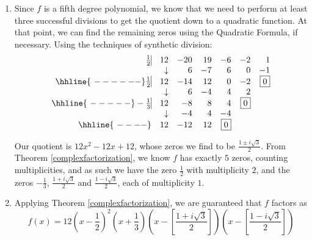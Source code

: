 \documentclass{ximera}
\begin{document}
\begin{exampleSol}
\begin{enumerate}
\item  Since $f$ is a fifth degree polynomial, we know that we need to perform at least three successful divisions to get the quotient down to a quadratic function.  At that point, we can find the remaining zeros using the Quadratic Formula, if necessary.  Using the techniques of synthetic division: %
\[
\begin{array}{rrrrrrr}
    \frac{1}{2}   \vline& 12 & -20& 19  & -6 & -2 &1 \\
    & \downarrow     &  6  &  -7  & 6 & 0 & -1\\ \hhline{~------} \frac{1}{2}   \vline& 12 & -14 & 12  & 0 & -2 & \fbox{$0$} \\
    & \downarrow     &  6 &  -4  & 4 & 2 &\\ \hhline{~-----} -\frac{1}{3}   \vline&  12 &  -8  & 8 & 4 &  \fbox{$0$} & \\
    & \downarrow &  -4  &  4  & -4  & & \\ \hhline{~----} & 12  &   -12 & 12& \fbox{0} &&   \\
\end{array}
\]

Our quotient is $12x^2 - 12x + 12$, whose zeros we find to be $\frac{1 \pm i \sqrt{3}}{2}$.  From Theorem \ref{complexfactorization}, we know $f$ has exactly $5$ zeros, counting multiplicities, and as such we have the zero $\frac{1}{2}$ with multiplicity $2$, and the zeros $-\frac{1}{3}$, $\frac{1 + i \sqrt{3}}{2}$ and $\frac{1 - i \sqrt{3}}{2}$, each of multiplicity $1$.

\item  Applying Theorem \ref{complexfactorization}, we are guaranteed that $f$ factors as
\[
    f(x) = 12 \left(x- \dfrac{1}{2}\right)^2 \left(x + \dfrac{1}{3}\right) \left(x - \left[\dfrac{1 + i \sqrt{3}}{2}\right]\right) \left(x - \left[\dfrac{1 - i \sqrt{3}}{2}\right]\right)
\]
\end{enumerate}

\end{exampleSol}
\end{document}
